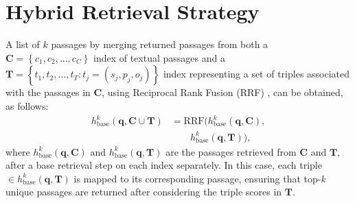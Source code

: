 \section{Hybrid Retrieval Strategy}
\label{appendix_sec:preliminaries}

A list of $k$ passages by merging returned passages from both a $\mathbf{C} = \left \{c_1, c_2, \ldots, c_C \right \}$ index of textual passages and a $\mathbf{T} = \left \{t_1, t_2, \ldots,t_T: t_j = \left ( s_j, p_j, o_j \right ) \right \}$ index representing a set of triples associated with the passages in $\mathbf{C}$, using Reciprocal Rank Fusion (RRF) \cite{Cormack2009}, can be obtained, as follows:
\begin{align}
h^k_{\text{base}}\left( \mathbf{q}, {\mathbf{C} \cup \mathbf{T}} \right) 
    &= \text{RRF} \Big ( h^k_{\text{base}}\left( \mathbf{q}, {\mathbf{C}}\right), \nonumber \\
    &\quad\quad h^k_{\text{base}}\left( \mathbf{q}, {\mathbf{T}} \right) \Big ),
    \label{eq:triple_passage_index_retrieve}
\end{align}
where $h^k_{\text{base}}\left( \mathbf{q}, {\mathbf{C}}\right)$ and $h^k_{\text{base}}\left( \mathbf{q}, {\mathbf{T}}\right)$ are the passages retrieved from $\mathbf{C}$ and $\mathbf{T}$, after a base retrieval step on each index separately. In this case, each triple $\in h^k_{\text{base}}\left( \mathbf{q}, {\mathbf{T}} \right)$ is mapped to its corresponding passage, ensuring that top-$k$ unique passages are returned after considering the triple scores in $\mathbf{T}$.


